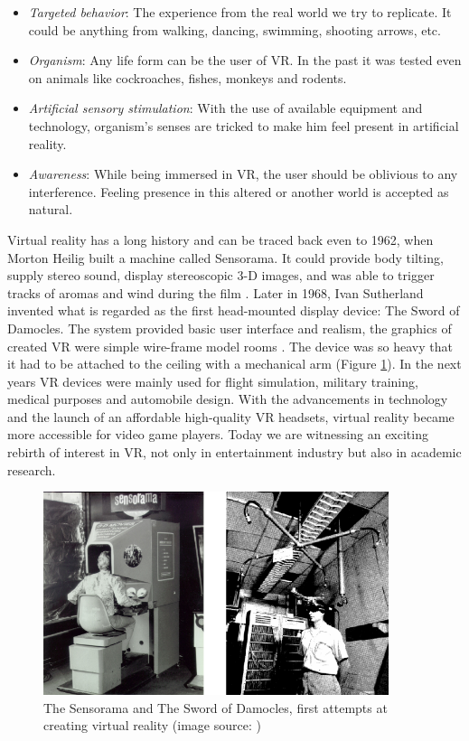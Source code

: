 \begin{itemize}
\item \textit{Targeted behavior}: The experience from the real world we try to replicate. It could be anything from walking, dancing, swimming, shooting arrows, etc.
\item \textit{Organism}: Any life form can be the user of VR. In the past it was tested even on animals like cockroaches, fishes, monkeys and rodents.
\item \textit{Artificial sensory stimulation}: With the use of available equipment and technology, organism’s senses are tricked to make him feel present in artificial reality.
\item \textit{Awareness}: While being immersed in VR, the user should be oblivious to any interference. Feeling presence in this altered or another world is accepted as natural.
\end{itemize}

Virtual reality has a long history and can be traced back even to 1962, when Morton Heilig built a machine called Sensorama. It could provide body tilting, supply stereo sound, display stereoscopic 3-D images, and was able to trigger tracks of aromas and wind during the film \cite{SENSORAMA}. Later in 1968, Ivan Sutherland invented what is regarded as the first head-mounted display device: The Sword of Damocles. The system provided basic user interface and realism, the graphics of created VR were simple wire-frame model rooms \cite{DAMOCLES}. The device was so heavy that it had to be attached to the ceiling with a mechanical arm (Figure \ref{fig:FIRST_VR}). In the next years VR devices were mainly used for flight simulation, military training, medical purposes and automobile design. With the advancements in technology and the launch of an affordable high-quality VR headsets, virtual reality became more accessible for video game players. Today we are witnessing an exciting rebirth of interest in VR, not only in entertainment industry but also in academic research.

\begin{figure}[th]
\centering
\includegraphics[width=0.9\textwidth]{img/first_vr.png}
\caption{The Sensorama and The Sword of Damocles, first attempts at creating virtual reality (image source: \cite{SENSORAMA_IMAGE}\cite{DAMOCLES})}
\label{fig:FIRST_VR}
\end{figure}

